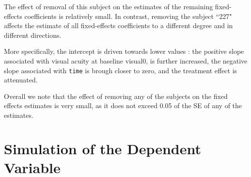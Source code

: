 \documentclass[a4paper,12pt]{article}
\begin{document}

The effect of removal of this subject on the estimates of the remaining fixed-effects coefficients is relatively small.
In contrast, removing the subject ``227" affects the estimate of all fixed-effects coefficients to a different degree and in different directions.

More specifically, the intercept is driven towards lower values : the positive slope associated with visual acuity at baseline visual0, is further increased, the negative slope associated with \texttt{time} is brough closer to zero, and the treatment effect is attenuated.


Overall we note that the effect of removing any of the subjects on the fixed effects estimates is very small, as it does not exceed 0.05 of the SE of any of the  estimates.

\newpage
\section{Simulation of the Dependent Variable}
\end{document}
